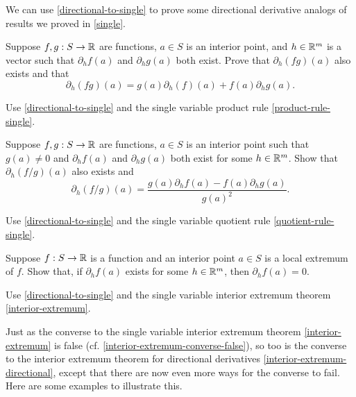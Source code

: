 We can use \cref{directional-to-single} to prove some directional derivative analogs of results we proved in \cref{single}.

\begin{exercise} \label{product-rule-directional} 
	Suppose $f, g : S \to \mathbb{R}$ are functions, $a \in S$ is an interior point, and $h \in \mathbb{R}^m$ is a vector such that $\partial_h f(a)$ and $\partial_h g(a)$ both exist. Prove that $\partial_h (fg)(a)$ also exists and that
	\[ \partial_h (fg)(a) = g(a)\partial_h(f)(a) + f(a) \partial_h g(a). \]
	\begin{hint} 
		Use \cref{directional-to-single} and the single variable product rule \ref{product-rule-single}.
	\end{hint}
\end{exercise}

\begin{exercise} \label{quotient-rule-directional} 
	Suppose $f, g : S \to \mathbb{R}$ are functions, $a \in S$ is an interior point such that $g(a) \neq 0$ and $\partial_h f(a)$ and $\partial_h g(a)$ both exist for some $h \in \mathbb{R}^m$. Show that $\partial_h(f/g)(a)$ also exists and 
	\[ \partial_h(f/g)(a) = \frac{g(a)\partial_h f(a) - f(a)\partial_h g(a)}{g(a)^2}. \]
	\begin{hint} Use \cref{directional-to-single} and the single variable quotient rule \ref{quotient-rule-single}. \end{hint} 
\end{exercise}

\begin{exercise} \label{interior-extremum-directional} 
	Suppose $f : S \to \mathbb{R}$ is a function and an interior point $a \in S$ is a local extremum of $f$. Show that, if $\partial_h f(a)$ exists for some $h \in \mathbb{R}^m$, then $\partial_h f(a) = 0$. 
	\begin{hint} Use \cref{directional-to-single} and the single variable interior extremum theorem \ref{interior-extremum}. \end{hint}
\end{exercise}

Just as the converse to the single variable interior extremum theorem \ref{interior-extremum} is false (cf. \cref{interior-extremum-converse-false}), so too is the converse to the interior extremum theorem for directional derivatives \ref{interior-extremum-directional}, except that there are now even more ways for the converse to fail. Here are some examples to illustrate this.  

